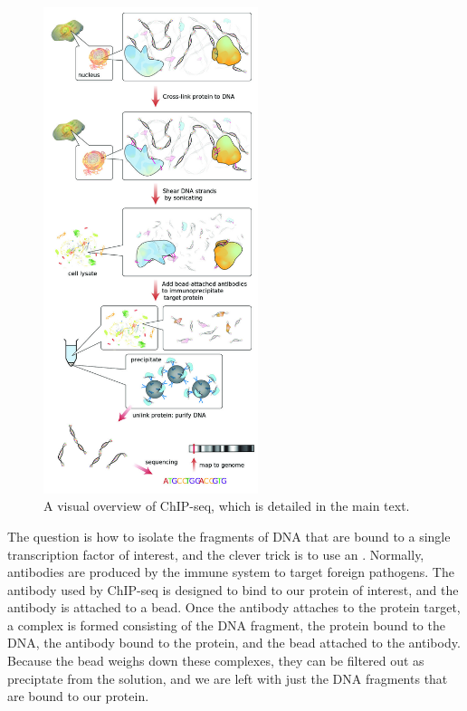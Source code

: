 \begin{figure}[hp]
\centering
\mySfFamily
\includegraphics[width = 0.56\textwidth]{../images_CMYK/ChIP-seq_workflow}
\caption{A visual overview of ChIP-seq, which is detailed in the main text.}
\label{fig:ChIP-seq_workflow}
\end{figure}

The question is how to isolate the fragments of DNA that are bound to a single transcription factor of interest, and the clever trick is to use an . Normally, antibodies are produced by the immune system to target foreign pathogens. The antibody used by ChIP-seq is designed to bind to our protein of interest, and the antibody is attached to a bead. Once the antibody attaches to the protein target, a complex is formed consisting of the DNA fragment, the protein bound to the DNA, the antibody bound to the protein, and the bead attached to the antibody. Because the bead weighs down these complexes, they can be filtered out as preciptate from the solution, and we are left with just the DNA fragments that are bound to our protein.

